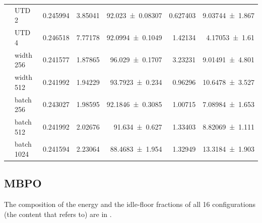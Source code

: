 {\begin{longtable}{@{}llrrrrr@{}}
     & UTD 2 & \num{0.245994} & \num{3.85041} & \num{92.023+-0.08307} & \num{0.627403} & \num{9.03744+-1.867} \\
     & UTD 4 & \num{0.246518} & \num{7.77178} & \num{92.0994+-0.1049} & \num{1.42134} & \num{4.17053+-1.61} \\
     & width 256 & \num{0.241577} & \num{1.87865} & \num{96.029+-0.1707} & \num{3.23231} & \num{9.01491+-4.801} \\
     & width 512 & \num{0.241992} & \num{1.94229} & \num{93.7923+-0.234} & \num{0.96296} & \num{10.6478+-3.527} \\
     & batch 256 & \num{0.243027} & \num{1.98595} & \num{92.1846+-0.3085} & \num{1.00715} & \num{7.08984+-1.653} \\
     & batch 512 & \num{0.241992} & \num{2.02676} & \num{91.634+-0.627} & \num{1.33403} & \num{8.82069+-1.111} \\
     & batch 1024 & \num{0.241594} & \num{2.23064} & \num{88.4683+-1.954} & \num{1.32949} & \num{13.3184+-1.903} \\
  \end{longtable}
}


\subsection{MBPO}\label{sec:app-full-mbpo}

The composition of the energy and the idle-floor fractions of all \num{16} configurations (the content that  refers to) are in .

